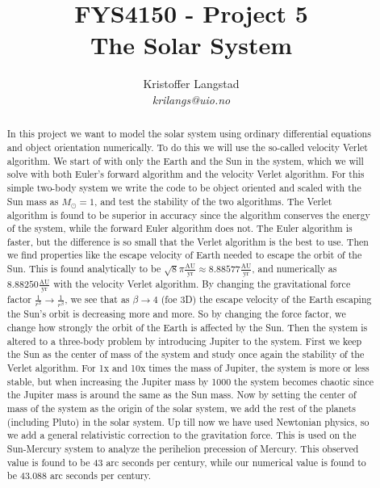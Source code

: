 \documentclass[12pt,a4paper,english]{article}
\title{FYS4150 - Project 5\\
The Solar System}
\date{}
\author{ Kristoffer Langstad\\ \textit{krilangs@uio.no}}
\begin{document}
\maketitle
\begin{abstract}
	In this project we want to model the solar system using ordinary differential equations and object orientation numerically. To do this we will use the so-called velocity Verlet algorithm. We start of with only the Earth and the Sun in the system, which we will solve with both Euler's forward algorithm and the velocity Verlet algorithm. For this simple two-body system we write the code to be object oriented and scaled with the Sun mass as $M_\odot=1$, and test the stability of the two algorithms. The Verlet algorithm is found to be superior in accuracy since the algorithm conserves the energy of the system, while the forward Euler algorithm does not. The Euler algorithm is faster, but the difference is so small that the Verlet algorithm is the best to use. Then we find properties like the escape velocity of Earth needed to escape the orbit of the Sun. This is found analytically to be $\sqrt{8}\pi\frac{\text{AU}}{\text{yr}}\approx8.88577\frac{\text{AU}}{\text{yr}}$, and numerically as $8.88250\frac{\text{AU}}{\text{yr}}$ with the velocity Verlet algorithm. By changing the gravitational force factor $\frac{1}{r^3}\rightarrow\frac{1}{r^{\beta}}$, we see that as $\beta\rightarrow4$ (foe 3D) the escape velocity of the Earth escaping the Sun's orbit is decreasing more and more. So by changing the force factor, we change how strongly the orbit of the Earth is affected by the Sun. Then the system is altered to a three-body problem by introducing Jupiter to the system. First we keep the Sun as the center of mass of the system and study once again the stability of the Verlet algorithm. For 1x and 10x times the mass of Jupiter, the system is more or less stable, but when increasing the Jupiter mass by 1000 the system becomes chaotic since the Jupiter mass is around the same as the Sun mass. Now by setting the center of mass of the system as the origin of the solar system, we add the rest of the planets (including Pluto) in the solar system. Up till now we have used Newtonian physics, so we add a general relativistic correction to the gravitation force. This is used on the Sun-Mercury system to analyze the perihelion precession of Mercury. This observed value is found to be 43 arc seconds per century, while our numerical value is found to be 43.088 arc seconds per century.
\end{abstract}
\end{document}
